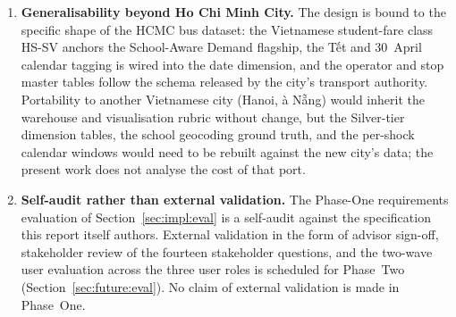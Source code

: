 \begin{enumerate}
    \item \textbf{Generalisability beyond Ho Chi Minh City.} The design
    is bound to the specific shape of the HCMC bus dataset: the
    Vietnamese student-fare class HS-SV anchors the School-Aware
    Demand flagship, the Tết and 30~April calendar tagging is wired
    into the date dimension, and the operator and stop master tables
    follow the schema released by the city's transport authority.
    Portability to another Vietnamese city (Hanoi, {\DJ}\`a N\~\u{a}ng)
    would inherit the warehouse and visualisation rubric without
    change, but the Silver-tier dimension tables, the school
    geocoding ground truth, and the per-shock calendar windows would
    need to be rebuilt against the new city's data; the present work
    does not analyse the cost of that port.

    \item \textbf{Self-audit rather than external validation.} The
    Phase-One requirements evaluation of
    Section~\ref{sec:impl:eval} is a self-audit against the
    specification this report itself authors. External validation in
    the form of advisor sign-off, stakeholder review of the fourteen
    stakeholder questions, and the two-wave user evaluation across
    the three user roles is scheduled for Phase~Two
    (Section~\ref{sec:future:eval}). No claim of external validation
    is made in Phase~One.
\end{enumerate}
